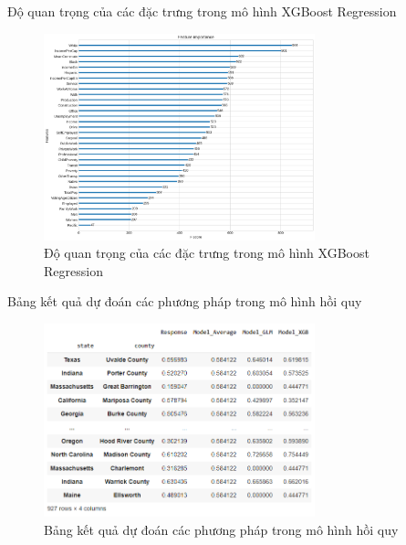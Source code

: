 \documentclass[10pt]{beamer}
\theoremstyle{remark}
\theoremstyle{definition}
\begin{document}
\begin{frame}{Độ quan trọng của các đặc trưng trong mô hình XGBoost Regression}
	\begin{figure}[h!]
        \centering
        \includegraphics[width=0.7\textwidth]{figures/XGBoost_Regression_Feature_Importance.png}
        \caption{Độ quan trọng của các đặc trưng trong mô hình XGBoost Regression}
    \end{figure}
\end{frame}


\begin{frame}{Bảng kết quả dự đoán các phương pháp trong mô hình hồi quy}
	\begin{figure}[h!]
        \centering
        \includegraphics[width=0.7\textwidth]{figures/Regression_Model_Result.png}
        \caption{Bảng kết quả dự đoán các phương pháp trong mô hình hồi quy}
    \end{figure}
\end{frame}
\end{document}
